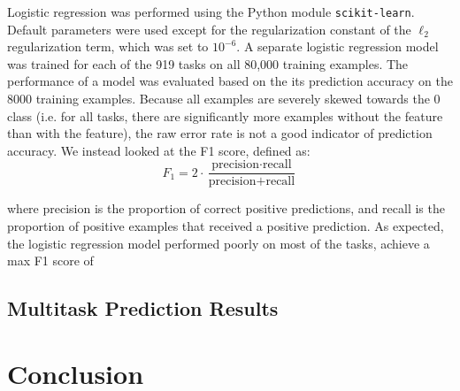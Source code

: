\documentclass{article} %
\begin{document}
Logistic regression was performed using the Python module \texttt{scikit-learn}. Default parameters were used except for the regularization constant of the $\ell_2$ regularization term, which was set to $10^{-6}$. A separate logistic regression model was trained for each of the 919 tasks on all 80,000 training examples. The performance of a model was evaluated based on the its prediction accuracy on the 8000 training examples. Because all examples are severely skewed towards the 0 class (i.e. for all tasks, there are significantly more examples without the feature than with the feature), the raw error rate is not a good indicator of prediction accuracy. We instead looked at the F1 score, defined as:
$$ F_1 = 2 \cdot \frac{\mbox{precision} \cdot \mbox{recall} }{\mbox{precision} + \mbox{recall}} $$

where precision is the proportion of correct positive predictions, and recall is the proportion of positive examples that received a positive prediction. As expected, the logistic regression model performed poorly on most of the tasks, achieve a max F1 score of 

\subsection{Multitask Prediction Results}

\section{Conclusion}
 


\end{document}
